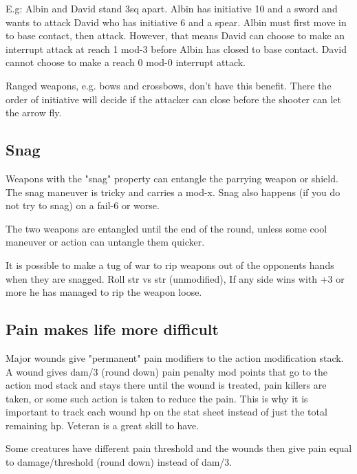 E.g: Albin and David stand 3sq apart. Albin has initiative 10 and a sword and wants to attack David who has initiative 6 and a spear. Albin must first move in to base contact, then attack. However, that means David can choose to make an interrupt attack at reach 1 mod-3 before Albin has closed to base contact. David cannot choose to make a reach 0 mod-0 interrupt attack.

Ranged weapons, e.g. bows and crossbows, don't have this benefit. There the order of initiative will decide if the attacker can close before the shooter can let the arrow fly.


\subsection*{Snag}
Weapons with the "snag" property can entangle the parrying weapon or shield. The snag maneuver is tricky and carries a mod-x. Snag also happens (if you do not try to snag) on a fail-6 or worse.

The two weapons are entangled until the end of the round, unless some cool maneuver or action can untangle them quicker.

It is possible to make a tug of war to rip weapons out of the opponents hands when they are snagged. Roll str vs str (unmodified), If any side wins with +3 or more he has managed to rip the weapon loose.


\subsection*{Pain makes life more difficult}
Major wounds give "permanent" pain modifiers to the action modification stack.
A wound gives dam/3 (round down) pain penalty mod points that go to the action mod stack and stays there until the wound is treated, pain killers are taken, or some such action is taken to reduce the pain. This is why it is important to track each wound hp on the stat sheet instead of just the total remaining hp.
Veteran is a great skill to have.

Some creatures have different pain threshold and the wounds then give pain equal to damage/threshold (round down) instead of dam/3.


%
%

